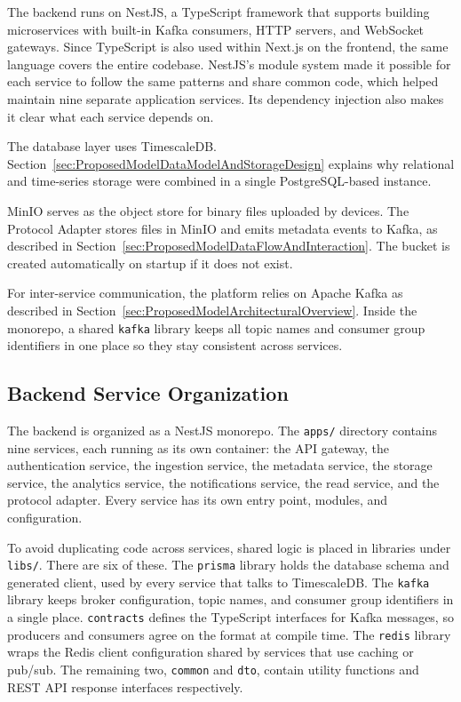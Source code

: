 The backend runs on NestJS, a TypeScript framework that supports building microservices with built-in Kafka consumers, \gls{HTTP} servers, and WebSocket gateways. Since TypeScript is also used within Next.js on the frontend, the same language covers the entire codebase. NestJS's module system made it possible for each service to follow the same patterns and share common code, which helped maintain nine separate application services. Its dependency injection also makes it clear what each service depends on.

The database layer uses TimescaleDB. Section~\ref{sec:ProposedModelDataModelAndStorageDesign} explains why relational and time-series storage were combined in a single PostgreSQL-based instance.

MinIO serves as the object store for binary files uploaded by devices. The Protocol Adapter stores files in MinIO and emits metadata events to Kafka, as described in Section~\ref{sec:ProposedModelDataFlowAndInteraction}. The bucket is created automatically on startup if it does not exist.

For inter-service communication, the platform relies on Apache Kafka as described in Section~\ref{sec:ProposedModelArchitecturalOverview}. Inside the monorepo, a shared \texttt{kafka} library keeps all topic names and consumer group identifiers in one place so they stay consistent across services.

\subsection{Backend Service Organization}
The backend is organized as a NestJS monorepo. The \texttt{apps/} directory contains nine services, each running as its own container: the \gls{API} gateway, the authentication service, the ingestion service, the metadata service, the storage service, the analytics service, the notifications service, the read service, and the protocol adapter. Every service has its own entry point, modules, and configuration.

To avoid duplicating code across services, shared logic is placed in libraries under \texttt{libs/}. There are six of these. The \texttt{prisma} library holds the database schema and generated client, used by every service that talks to TimescaleDB. The \texttt{kafka} library keeps broker configuration, topic names, and consumer group identifiers in a single place. \texttt{contracts} defines the TypeScript interfaces for Kafka messages, so producers and consumers agree on the format at compile time. The \texttt{redis} library wraps the Redis client configuration shared by services that use caching or pub/sub. The remaining two, \texttt{common} and \texttt{dto}, contain utility functions and \gls{REST} \gls{API} response interfaces respectively.

